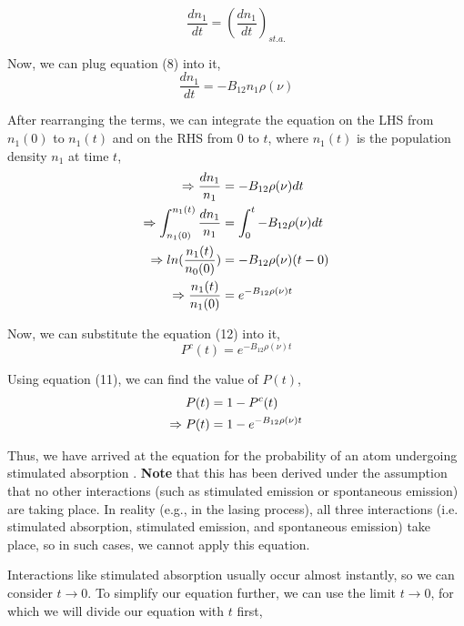 \documentclass[12pt]{article}
\begin{document}
\begin{equation*}
    \frac{dn_{1}}{dt} = (\frac{dn_{1}}{dt})_{st.a.}
\end{equation*} \vspace{.1cm}

Now, we can plug equation (8) into it,
\begin{equation*}
    \frac{dn_{1}}{dt} = -B_{12}n_{1}\rho(\nu) 
\end{equation*}

After rearranging the terms, we can integrate the equation on the LHS from $n_{1}(0)$ to $n_{1}(t)$ and on the RHS from $0$ to $t$, where $n_{1}(t)$ is the population density $n_{1}$ at time $t$,
\begin{align}
    \Rightarrow \frac{dn_{1}}{n_{1}} & = -B_{12}\rho(\nu)dt \notag \\
    \Rightarrow \int_{n_{1}(0)}^{n_{1}(t)} \frac{dn_{1}}{n_{1}} & = \int_{0}^{t} -B_{12}\rho(\nu)dt \notag \\
    \Rightarrow ln(\frac{n_{1}(t)}{n_{0}(0)}) & = -B_{12}\rho(\nu)(t - 0) \notag \\
    \Rightarrow \frac{n_{1}(t)}{n_{1}(0)} & = e^{-B_{12}\rho(\nu)t}
\end{align}

Now, we can substitute the equation (12) into it,
\begin{equation*}
    P^c(t) = e^{-B_{12}\rho(\nu)t}
\end{equation*}

Using equation (11), we can find the value of $P(t)$,
\begin{align}
    P(t) & = 1 - P^c(t) \notag \\
    \Rightarrow P(t) & = 1 - e^{-B_{12}\rho(\nu)t}
\end{align}

Thus, we have arrived at the equation for the probability of an atom undergoing stimulated absorption . \textbf{Note} that this has been derived under the assumption that no other interactions (such as stimulated emission or spontaneous emission) are taking place. In reality (e.g., in the lasing process), all three interactions (i.e. stimulated absorption, stimulated emission, and spontaneous emission) take place, so in such cases, we cannot apply this equation. \vspace{.2cm}

Interactions like stimulated absorption usually occur almost instantly, so we can consider $t \rightarrow 0$. To simplify our equation further, we can use the limit $t \rightarrow 0$, for which we will divide our equation with $t$ first,
\end{document}
